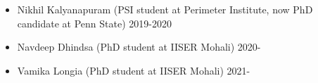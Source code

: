 \renewcommand{\arraystretch}{1.1}
\begin{itemize}
  \item  Nikhil Kalyanapuram (PSI student at Perimeter Institute, now PhD candidate at Penn State) \hfill  2019-2020 
  \item  Navdeep Dhindsa (PhD student at IISER Mohali) \hfill 2020- 
  \item  Vamika Longia (PhD student at IISER Mohali) \hfill 2021- 
  \end{itemize}
